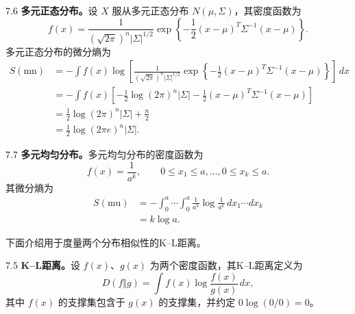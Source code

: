 \begin{bookexample}{7.6}
\textbf{多元正态分布。}设 $X$ 服从多元正态分布 $N(\mu,\Sigma)$，其密度函数为
\begin{equation}
f(x)=\frac1{(\sqrt{2\pi})^n|\Sigma|^{1/2}}
\exp\left\{-\frac12(x-\mu)^T\Sigma^{-1}(x-\mu)\right\}.
\tag{7.23}
\end{equation}
多元正态分布的微分熵为
\begin{equation}
\begin{aligned}
S(\mathrm{mn})&=-\int f(x)\log\left[\frac1{(\sqrt{2\pi})^n|\Sigma|^{1/2}}
\exp\left\{-\frac12(x-\mu)^T\Sigma^{-1}(x-\mu)\right\}\right]\,dx\\
&=-\int f(x)\left[-\frac12\log(2\pi)^n|\Sigma|-\frac12(x-\mu)^T\Sigma^{-1}(x-\mu)\right]\\
&=\frac12\log(2\pi)^n|\Sigma|+\frac n2\\
&=\frac12\log(2\pi e)^n|\Sigma|.
\end{aligned}
\tag{7.24}
\end{equation}
\end{bookexample}

\begin{bookexample}{7.7}
\textbf{多元均匀分布。}多元均匀分布的密度函数为
\begin{equation}
f(x)=\frac1{a^k},\qquad 0\le x_1\le a,\ldots,0\le x_k\le a.
\tag{7.25}
\end{equation}
其微分熵为
\begin{equation}
\begin{aligned}
S(\mathrm{mu})&=-\int_0^a\cdots\int_0^a\frac1{a^k}\log\frac1{a^k}\,dx_1\cdots dx_k\\
&=k\log a.
\end{aligned}
\tag{7.26}
\end{equation}
\end{bookexample}

下面介绍用于度量两个分布相似性的K–L距离。

\begin{bookdefinition}{7.5}
\textbf{K–L距离。}设 $f(x)$、$g(x)$ 为两个密度函数，其K–L距离定义为
\begin{equation}
D(f\Vert g)=\int f(x)\log\frac{f(x)}{g(x)}\,dx,
\tag{7.27}
\end{equation}
其中 $f(x)$ 的支撑集包含于 $g(x)$ 的支撑集，并约定 $0\log(0/0)=0$。
\end{bookdefinition}

